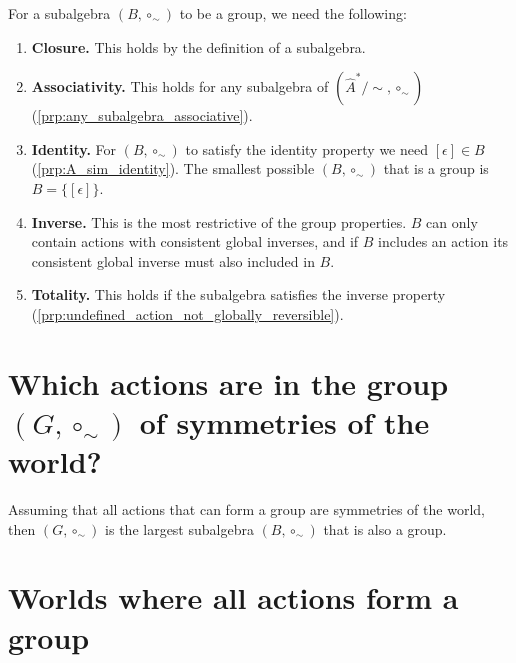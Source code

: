For a subalgebra $(B, \circ_{\sim})$ to be a group, we need the following:
\begin{enumerate}[(1)]
    \item \textbf{Closure.}
    This holds by the definition of a subalgebra.
    
    \item \textbf{Associativity.}
    This holds for any subalgebra of $(\hat{A}^{*}/\sim, \circ_{\sim})$ (\cref{prp:any_subalgebra_associative}).

    \item \textbf{Identity.}
    For $(B, \circ_{\sim})$ to satisfy the identity property we need $[\epsilon] \in B$ (\cref{prp:A_sim_identity}).
    The smallest possible $(B, \circ_{\sim})$ that is a group is $B = \{ [\epsilon] \}$.

    \item \textbf{Inverse.}
    This is the most restrictive of the group properties.
    $B$ can only contain actions with consistent global inverses, and if $B$ includes an action its consistent global inverse must also included in $B$.

    \item \textbf{Totality.}
    This holds if the subalgebra satisfies the inverse property (\cref{prp:undefined_action_not_globally_reversible}).
\end{enumerate}




\section{Which actions are in the group \texorpdfstring{$(G, \circ_{\sim})$}{} of symmetries of the world?}


Assuming that all actions that can form a group are symmetries of the world, then $(G, \circ_{\sim})$ is the largest subalgebra $(B, \circ_{\sim})$ that is also a group.

\section{Worlds where all actions form a group}

